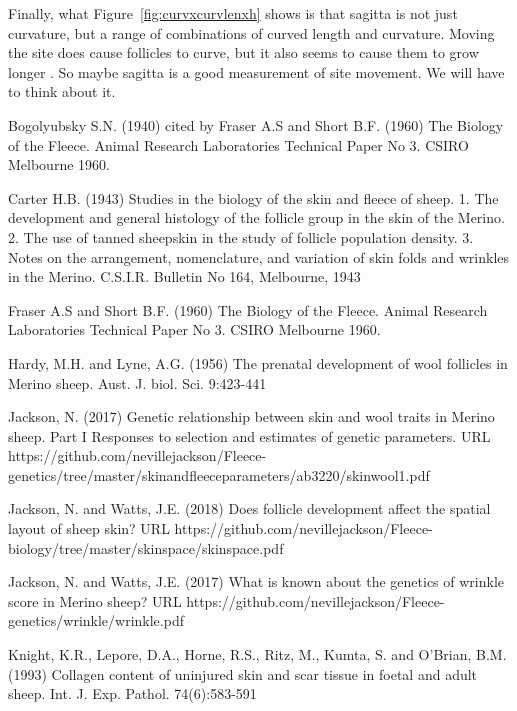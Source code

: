 \documentclass[titlepage]{article}  %
\begin{document}
Finally, what Figure~\ref{fig:curvxcurvlenxh} shows is that sagitta is not just curvature, but a range of combinations of curved length and curvature. Moving the site does cause follicles to curve, but it also seems to cause them to grow longer . So maybe sagitta is a good measurement of site movement. We will have to think about it.


\clearpage
\begin{thebibliography}{99}

 Bogolyubsky S.N. (1940) cited by Fraser A.S and Short B.F. (1960) The Biology of the Fleece. Animal Research Laboratories Technical Paper No 3. CSIRO Melbourne 1960.


Carter H.B. (1943) Studies in the biology of the skin and fleece of sheep. 1. The development and general histology of the follicle group in the skin of the Merino. 2. The use of tanned sheepskin in the study of follicle population density. 3. Notes on the arrangement, nomenclature, and variation of skin folds and wrinkles in the Merino. C.S.I.R. Bulletin No 164, Melbourne, 1943

Fraser A.S and Short B.F. (1960) The Biology of the Fleece. Animal Research Laboratories Technical Paper No 3. CSIRO Melbourne 1960.

Hardy, M.H. and Lyne, A.G. (1956) The prenatal development of wool follicles in Merino sheep. Aust. J. biol. Sci. 9:423-441

Jackson, N. (2017) Genetic relationship between skin and wool traits in Merino sheep. Part I Responses to selection and estimates of genetic parameters. URL https://github.com/nevillejackson/Fleece-genetics/tree/master/skinandfleeceparameters/ab3220/skinwool1.pdf

Jackson, N. and Watts, J.E. (2018) Does follicle development affect the spatial layout of sheep skin? URL https://github.com/nevillejackson/Fleece-biology/tree/master/skinspace/skinspace.pdf


Jackson, N. and Watts, J.E. (2017) What is known about the genetics of wrinkle score in Merino sheep? URL https://github.com/nevillejackson/Fleece-genetics/wrinkle/wrinkle.pdf

Knight, K.R., Lepore, D.A., Horne, R.S., Ritz, M., Kumta, S. and O'Brian, B.M. (1993) Collagen content of uninjured skin and scar tissue in foetal and adult sheep. Int. J. Exp. Pathol. 74(6):583-591


\end{thebibliography}
\end{document}
